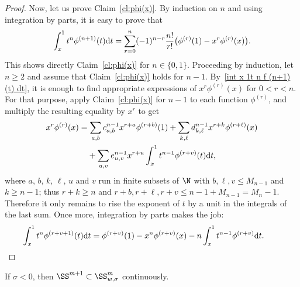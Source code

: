 \begin{proof}
  Now, let us prove Claim~\ref{cl:phi(x)}. By induction on $n$ and using integration by parts, it is easy to prove that
    \begin{gather}\label{int x 1t n f (n+1)(t) dt}
      \int_x^1t^n\phi^{(n+1)}(t){\rm d}t=\sum_{r=0}^n(-1)^{n-r} \frac{n!}{r!} \bigl(\phi^{(r)}(1)-x^r\phi^{(r)}(x)\bigr) .
      \end{gather}
  This shows directly Claim~\ref{cl:phi(x)} for $n\in\{0,1\}$. Proceeding by induction, let $n\ge2$ and assume that Claim~\ref{cl:phi(x)} holds for $n-1$. By~\eqref{int x 1t n f (n+1)(t) dt}, it is enough to f\/ind appropriate expressions of $x^r\phi^{(r)}(x)$ for $0<r<n$. For that purpose, apply Claim~\ref{cl:phi(x)} for $n-1$ to each function $\phi^{(r)}$, and multiply the resulting equality by $x^r$ to get
    \begin{gather*}
    \begin{split}
    &  x^r\phi^{(r)}(x)=\sum_{a,b}c^{n-1}_{a,b}x^{r+a}\phi^{(r+b)}(1)+\sum_{k,\ell}d^{n-1}_{k,\ell}x^{r+k}\phi^{(r+\ell)}(x)\\
& \hphantom{x^r\phi^{(r)}(x)=}{}+\sum_{u,v}e^{n-1}_{u,v}x^{r+u}\int_x^1t^{n-1}\phi^{(r+v)}(t){\rm d}t ,
\end{split}
    \end{gather*}
  where $a$, $b$, $k$, $\ell$, $u$ and $v$ run in f\/inite subsets of $\N$ with $b,\ell,v\le M_{n-1}$ and $k\ge n-1$; thus $r+k\ge n$ and $r+b,r+\ell,r+v\le n-1+M_{n-1}=M_n-1$. Therefore it only remains to rise the exponent of $t$ by a unit in the integrals of the last sum. Once more, integration by parts makes the job:
    \begin{gather*}
      \int_x^1t^n\phi^{(r+v+1)}(t){\rm d}t=\phi^{(r+v)}(1)-x^n\phi^{(r+v)}(x)-n\int_x^1t^{n-1}\phi^{(r+v)}{\rm d}t .\tag*{\qed}
    \end{gather*}
\renewcommand{\qed}{}
\end{proof}

\begin{Lemma}\label{l:SS m+1 subset SS w,sigma m}
  If $\sigma<0$, then $\SS^{m+1}\subset\SS_{w,\sigma}^m$ continuously.
\end{Lemma}

